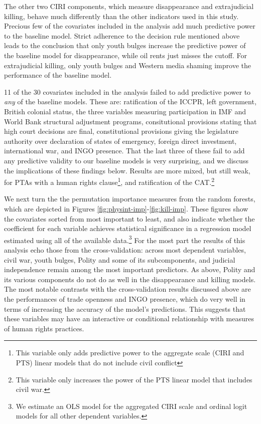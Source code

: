 \documentclass[12pt]{article}
\begin{document}
The other two CIRI components, which measure disappearance and extrajudicial killing, behave much differently than the other indicators used in this study. Precious few of the covariates included in the analysis add much predictive power to the baseline model. Strict adherence to the decision rule mentioned above leads to the conclusion that only youth bulges increase the predictive power of the baseline model for disappearance, while oil rents just misses the cutoff. For extrajudicial killing, only youth bulges and Western media shaming improve the performance of the baseline model. 

11 of the 30 covariates included in the analysis failed to add predictive power to {\it any} of the baseline models. These are: ratification of the ICCPR, left government, British colonial status, the three variables measuring participation in IMF and World Bank structural adjustment programs, consitutional provisions stating that high court decisions are final, constitutional provisions giving the legislature authority over declaration of states of emergency, foreign direct investment, international war, and INGO presence. That the last three of these fail to add any predictive validity to our baseline models is very surprising, and we discuss the implications of these findings below. Results are more mixed, but still weak, for PTAs with a human rights clause\footnote{This variable only adds predictive power to the aggregate scale (CIRI and PTS) linear models that do not include civil conflict}, and ratification of the CAT.\footnote{This variable only increases the power of the PTS linear model that includes civil war.}

We next turn the the permutation importance measures from the random forests, which are depicted in Figures \ref{fig:physint-imp}-\ref{fig:kill-imp}. These figures show the covariates sorted from most important to least, and also indicate whether the coefficient for each variable achieves statistical significance in a regression model estimated using all of the available data.\footnote{We estimate an OLS model for the aggregated CIRI scale and ordinal logit models for all other dependent variables.} For the most part the results of this analysis echo those from the cross-validation: across most dependent variables, civil war, youth bulges, Polity and some of its subcomponents, and judicial independence remain among the most important predictors. As above, Polity and its various components do not do as well in the disappearance and killing models. The most notable contrasts with the cross-validation results discussed above are the performances of trade openness and INGO presence, which do very well in terms of increasing the accuracy of the model's predictions. This suggests that these variables may have an interactive or conditional relationship with measures of human rights practices. 
\end{document}
